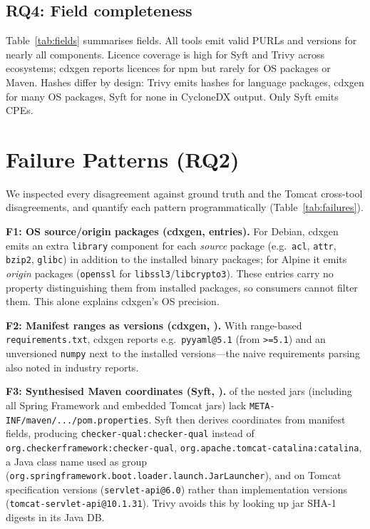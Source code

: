 \documentclass[conference]{IEEEtran}
\newcommand{\syft}{Syft\xspace}
\newcommand{\trivy}{Trivy\xspace}
\newcommand{\cdxgen}{cdxgen\xspace}
\begin{document}
\subsection{RQ4: Field completeness}
Table~\ref{tab:fields} summarises fields. All tools emit valid PURLs and versions for nearly all
components. Licence coverage is high for \syft and \trivy across ecosystems; \cdxgen reports licences
for npm but rarely for OS packages or Maven. Hashes differ by design: \trivy emits hashes for language
packages, \cdxgen for many OS packages, \syft for none in CycloneDX output. Only \syft emits CPEs.



\section{Failure Patterns (RQ2)}\label{sec:fail}
We inspected every disagreement against ground truth and the Tomcat cross-tool disagreements, and
quantify each pattern programmatically (Table~\ref{tab:failures}).

\textbf{F1: OS source/origin packages (\cdxgen, \FailFOneCdxgen{} entries).} For Debian, \cdxgen emits
an extra \texttt{library} component for each \emph{source} package (e.g.\ \texttt{acl}, \texttt{attr},
\texttt{bzip2}, \texttt{glibc}) in addition to the installed binary packages; for Alpine it emits
\emph{origin} packages (\texttt{openssl} for \texttt{libssl3}/\texttt{libcrypto3}). These entries carry
no property distinguishing them from installed packages, so consumers cannot filter them. This alone
explains \cdxgen's OS precision.

\textbf{F2: Manifest ranges as versions (\cdxgen, \FailFTwoCdxgen).} With range-based
\texttt{requirements.txt}, \cdxgen reports e.g.\ \texttt{pyyaml@5.1} (from \texttt{>=5.1}) and an
unversioned \texttt{numpy} next to the installed versions---the naive requirements parsing also noted
in industry reports.

\textbf{F3: Synthesised Maven coordinates (\syft, \FailFThreeSyft).} \NJarsNoMeta{} of the
\NNestedJars{} nested jars (including all Spring Framework and embedded Tomcat jars) lack
\texttt{META-INF/maven/.../pom.properties}. \syft then derives coordinates from manifest fields,
producing \texttt{checker-qual:checker-qual} instead of \texttt{org.checkerframework:checker-qual},
\texttt{org.apache.tomcat-catalina:catalina}, a Java class name used as group
(\texttt{org.springframework.boot.loader.launch.JarLauncher}), and on Tomcat specification versions
(\texttt{servlet-api@6.0}) rather than implementation versions (\texttt{tomcat-servlet-api@10.1.31}).
\trivy avoids this by looking up jar SHA-1 digests in its Java DB.
\end{document}
